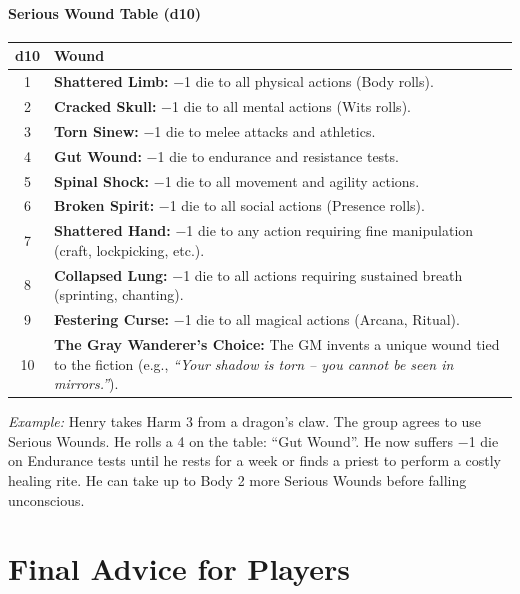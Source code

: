 \paragraph{Serious Wound Table (d10)}
\begin{center}
\begin{tabular}{cl}
\toprule
\textbf{d10} & \textbf{Wound} \\
\midrule
1 & \textbf{Shattered Limb:} −1 die to all physical actions (Body rolls). \\
2 & \textbf{Cracked Skull:} −1 die to all mental actions (Wits rolls). \\
3 & \textbf{Torn Sinew:} −1 die to melee attacks and athletics. \\
4 & \textbf{Gut Wound:} −1 die to endurance and resistance tests. \\
5 & \textbf{Spinal Shock:} −1 die to all movement and agility actions. \\
6 & \textbf{Broken Spirit:} −1 die to all social actions (Presence rolls). \\
7 & \textbf{Shattered Hand:} −1 die to any action requiring fine manipulation (craft, lockpicking, etc.). \\
8 & \textbf{Collapsed Lung:} −1 die to all actions requiring sustained breath (sprinting, chanting). \\
9 & \textbf{Festering Curse:} −1 die to all magical actions (Arcana, Ritual). \\
10 & \textbf{The Gray Wanderer's Choice:} The GM invents a unique wound tied to the fiction (e.g., \textit{``Your shadow is torn -- you cannot be seen in mirrors.''}). \\
\bottomrule
\end{tabular}
\end{center}

\noindent\textit{Example:} Henry takes Harm 3 from a dragon's claw. The group agrees to use Serious Wounds. He rolls a 4 on the table: ``Gut Wound''. He now suffers −1 die on Endurance tests until he rests for a week or finds a priest to perform a costly healing rite. He can take up to Body 2 more Serious Wounds before falling unconscious.

\section{Final Advice for Players}
\label{sec:healing-advice}

